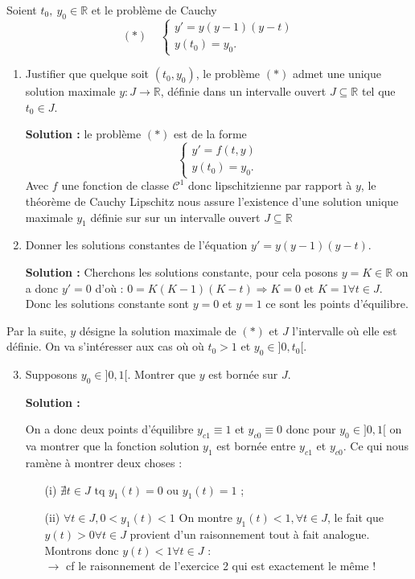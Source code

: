 \documentclass[12pt,a4paper]{article}
\newcommand{\R}{\mathbb{R}}
\newcommand{\solution}[1]{\par\noindent\textbf{\color{OliveGreen}Solution :} \textcolor{OliveGreen}{#1}}
\begin{document}
\begin{exo}
  Soient $t_0,\ y_0\in\R$ et le problème de Cauchy
$$
(*)\ \ \ \ \ \begin{cases}
y'=y(y-1)(y-t)\\
y(t_0)=y_0.
\end{cases}
$$
\begin{enumerate}
  \item Justifier que quelque soit $(t_0,y_0)$, le problème $(*)$ admet une unique solution maximale $y:J\longrightarrow\R$, définie dans un intervalle ouvert $J\subseteq\R$ tel que $t_0\in J$. 
\solution{le problème $(*)$ est de la forme 
$$
\begin{cases}
y'=f(t,y)\\
y(t_0)=y_0.
\end{cases}
$$
Avec $f$ une fonction de classe $\mathcal{C}^1$ donc lipschitzienne par rapport à $y$, le théorème de Cauchy Lipschitz nous assure l'existence d'une solution unique maximale $y_1$ définie sur sur un intervalle ouvert $J \subseteq \R$
}
  \item Donner les solutions constantes de l'équation $y'=y(y-1)(y-t)$.
\solution{Cherchons les solutions constante, pour cela posons $y=K \in \R$ on a donc $y' = 0$ d'où : $0 = K(K-1)(K-t) \Rightarrow K = 0 \text{ et } K = 1 \forall t \in J$.\\
Donc les solutions constante sont $y = 0$ et $y = 1$ ce sont les points d'équilibre.
}
\end{enumerate}
Par la suite, $y$ désigne la solution maximale de $(*)$ et $J$ l'intervalle où elle est définie. On va s'intéresser aux cas où
où $t_0>1$ et $y_0\in]0,t_0[$.
\begin{enumerate}
  \setcounter{enumi}{2}
  \item Supposons $y_0\in]0,1[$. Montrer que $y$ est bornée sur $J$.
\solution{On a donc deux points d'équilibre $y_{c1} \equiv 1$ et $y_{c0} \equiv 0$ donc pour $y_0 \in ]0,1[$ on va montrer que la fonction solution $y_1$ est bornée entre $y_{c1}$ et $y_{c0}$. Ce qui nous ramène à montrer deux choses : 
\begin{itemize}
	\item[(i)] $\nexists t \in J \text{ tq } y_1(t) = 0 \text{ ou } y_1(t) = 1$ ;
	\item[(ii)] $\forall t \in J, 0<y_1(t)<1$
		On montre $y_1(t) < 1, \forall t \in J$, le fait que $y(t) > 0 \forall t \in J$ provient d'un raisonnement tout à fait analogue.
		Montrons donc $y(t) < 1 \forall t \in J$ : \\ $\to$ cf le raisonnement de l'exercice 2 qui est exactement le même !

\end{itemize}}
\end{enumerate}
\end{exo}
\end{document}

